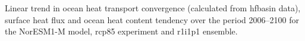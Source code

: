 \label{fig:noresm_full}
Linear trend in ocean heat transport convergence (calculated from hfbasin data), surface heat flux and ocean heat content tendency over the period 2006--2100 for the NorESM1-M model, rcp85 experiment and r1i1p1 ensemble.